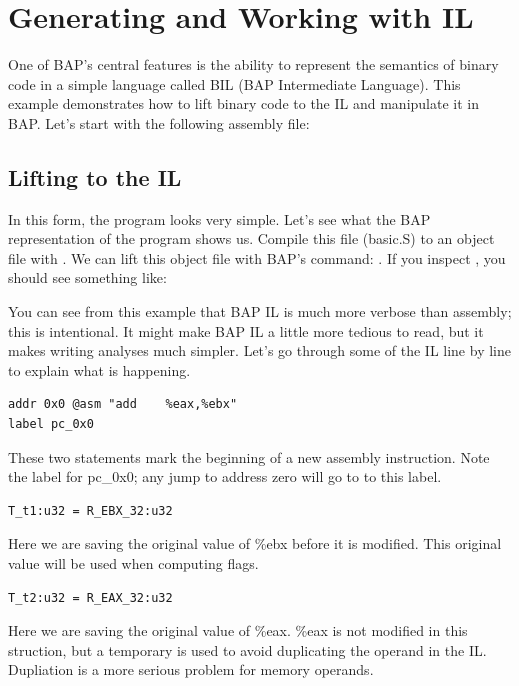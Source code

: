 \section{Generating and Working with IL}

One of BAP's central features is the ability to represent the
semantics of binary code in a simple language called BIL (BAP
Intermediate Language).  This example demonstrates how to lift binary
code to the IL and manipulate it in BAP.  Let's start with the
following assembly file:



\subsection{Lifting to the IL}

In this form, the program looks very simple.  Let's see what the BAP
representation of the program shows us.  Compile this file (basic.S)
to an object file with .  We can
lift this object file with BAP's  command: . If you inspect , you
should see something like:



You can see from this example that BAP IL is much more verbose than
assembly; this is intentional.  It might make BAP IL a little more
tedious to read, but it makes writing analyses much simpler.  Let's go
through some of the IL line by line to explain what is happening.

\begin{verbatim}
addr 0x0 @asm "add    %eax,%ebx"
label pc_0x0
\end{verbatim}
These two statements mark the beginning of a new assembly instruction.
Note the label for pc\_0x0; any jump to address zero will go to to
this label.

\begin{verbatim}
T_t1:u32 = R_EBX_32:u32
\end{verbatim}
Here we are saving the original value of \%ebx before it is modified.
This original value will be used when computing flags.

\begin{verbatim}
T_t2:u32 = R_EAX_32:u32
\end{verbatim}
Here we are saving the original value of \%eax.  \%eax is not modified
in this struction, but a temporary is used to avoid duplicating the
operand in the IL.  Dupliation is a more serious problem for memory
operands.

